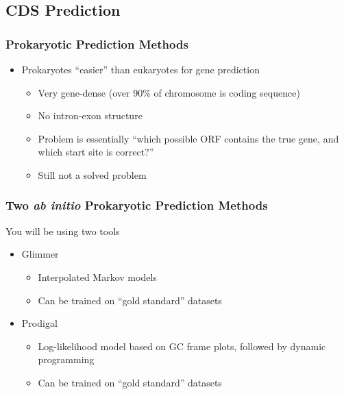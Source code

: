 \documentclass[table]{beamer}
\begin{document}
    \subsection{CDS Prediction}
    \begin{frame}
     \frametitle{Prokaryotic Prediction Methods}
     \begin{itemize}
       \item Prokaryotes ``easier'' than eukaryotes for gene prediction
       \begin{itemize}
         \item Very gene-dense (over 90\% of chromosome is coding sequence)
         \item No intron-exon structure
         \item Problem is essentially ``which possible ORF contains the true gene, and which start site is correct?''
         \item Still not a solved problem
       \end{itemize}       
     \end{itemize}
    \end{frame}

    \begin{frame}
     \frametitle{Two \textit{ab initio} Prokaryotic Prediction Methods}
     You will be using two tools
     \begin{itemize}
       \item Glimmer
       \begin{itemize}
         \item Interpolated Markov models
         \item Can be trained on ``gold standard'' datasets
       \end{itemize}
       \item Prodigal
       \begin{itemize}
         \item Log-likelihood model based on GC frame plots, followed by dynamic programming
         \item Can be trained on ``gold standard'' datasets
       \end{itemize}
     \end{itemize}
    \end{frame}
\end{document}
